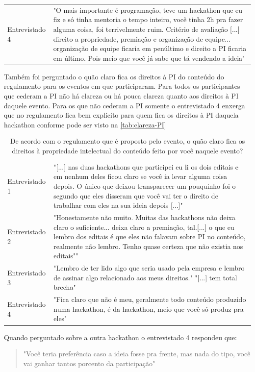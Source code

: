 \begin{table}[H]
\begin{tabular}{l|p{}}
Entrevistado 4 &
  "O mais importante é programação, teve um hackathon que eu fiz e só tinha mentoria o tempo inteiro, você tinha 2h pra fazer alguma coisa, foi terrivelmente ruim. Critério de avaliação {[}...{]} direito a propriedade, premiação e organização de equipe... organização de equipe ficaria em penúltimo e direito a PI ficaria em último. Pois meio que você já sabe que tá vendendo a ideia"
\end{tabular}
\end{table}

Também foi perguntado o quão claro fica os direitos à PI do conteúdo do regulamento para os eventos em que participaram. Para todos os participantes que cederam a PI não há clareza ou há pouca clareza quanto aos direitos à PI daquele evento. Para os que não cederam a PI somente o entrevistado 4 enxerga que no regulamento fica bem explícito para quem fica os direitos à PI daquela hackathon conforme pode ser visto na \autoref{tab:clareza-PI}



\begin{table}[H]
\centering
\caption{De acordo com o regulamento que é proposto pelo evento, o quão claro fica os direitos à propriedade intelectual do conteúdo feito por você naquele evento?}
\label{tab:clareza-PI}
\begin{tabular}{l|p{}}
Entrevistado 1 &
  "{[}...{]} nas duas hackathons que participei eu li os dois editais e em nenhum deles ficou claro se você ia levar alguma coisa depois. O único que deixou transparecer um pouquinho foi o segundo que eles disseram que você vai ter o direito de trabalhar com eles na sua ideia depois {[}...{]}" \\
Entrevistado 2 &
  "Honestamente não muito. Muitas das hackathons não deixa claro o suficiente... deixa claro a premiação, tal.{[}...{]} o que eu lembro dos editais é que eles não falavam sobre PI no conteúdo, realmente não lembro. Tenho quase certeza que não existia nos editais"" \\
Entrevistado 3 & "Lembro de ter lido algo que seria usado pela empresa e lembro de assinar algo relacionado aos meus direitos." "{[}...{]} tem total brecha" \\
Entrevistado 4 & "Fica claro que não é meu, geralmente todo conteúdo produzido numa hackathon, é da hackathon, meio que você só produz pra eles"            
\end{tabular}
\end{table}

Quando perguntado sobre a outra hackathon o entrevistado 4 respondeu que: \begin{quote}
    "Você teria preferência caso a ideia fosse pra frente, mas nada do tipo, você vai ganhar tantos porcento da participação" 
\end{quote}

